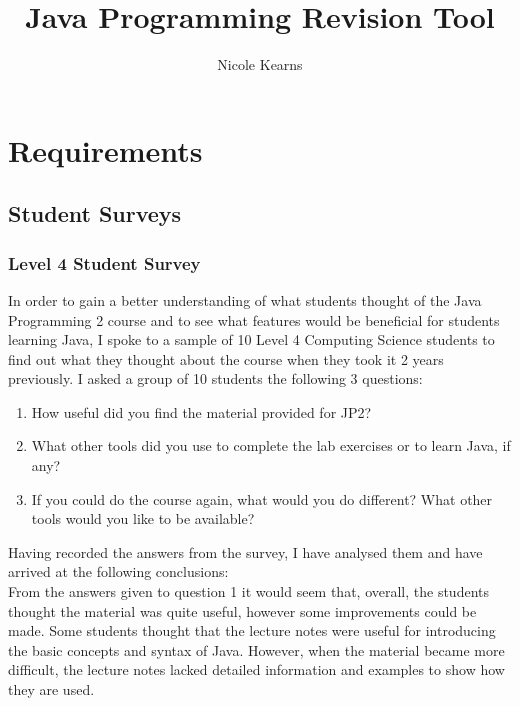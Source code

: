 \documentclass{article}
\begin{document}
\title{Java Programming Revision Tool}
\author{Nicole Kearns}
\maketitle
\tableofcontents

\newpage

\section{Requirements}

\subsection{Student Surveys}

\subsubsection{Level 4 Student Survey}

In order to gain a better understanding of what students thought of the Java Programming 2 course and to see what features would be beneficial for students learning Java, I spoke to a sample of 10 Level 4 Computing Science students to find out what they thought about the course when they took it 2 years previously. I asked a group of 10 students the following 3 questions:

\begin{enumerate}
\item How useful did you find the material provided for JP2? 
\item What other tools did you use to complete the lab exercises or to learn Java, if any?
\item If you could do the course again, what would you do different? What other tools would you like to be available?
\end{enumerate}

Having recorded the answers from the survey, I have analysed them and have arrived at the following conclusions:\\

From the answers given to question 1 it would seem that, overall, the students thought the material was quite useful, however some improvements could be made. Some students thought that the lecture notes were useful for introducing the basic concepts and syntax of Java. However, when the material became more difficult, the lecture notes lacked detailed information and examples to show how they are used.\\
\end{document}
